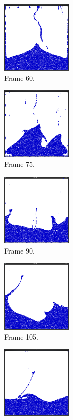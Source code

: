 \begin{figure}[ht!]
\begin{subfigure}[]{0.3\textwidth}
\end{subfigure}
\begin{subfigure}[]{0.3\textwidth}
\includegraphics[height=35mm]{png/multigrid4.png}
\caption{Frame 60.}
\end{subfigure}
\begin{subfigure}[]{0.3\textwidth}
\includegraphics[height=35mm]{png/multigrid5.png}
\caption{Frame 75.}
\end{subfigure}
\begin{subfigure}[]{0.3\textwidth}
\includegraphics[height=35mm]{png/multigrid6.png}
\caption{Frame 90.}
\end{subfigure}
\begin{subfigure}[]{0.3\textwidth}
\includegraphics[height=35mm]{png/multigrid7.png}
\caption{Frame 105.}
\end{subfigure}
\begin{subfigure}[]{0.3\textwidth}
\includegraphics[height=35mm]{png/multigrid8.png}

\end{subfigure}
\end{figure}
